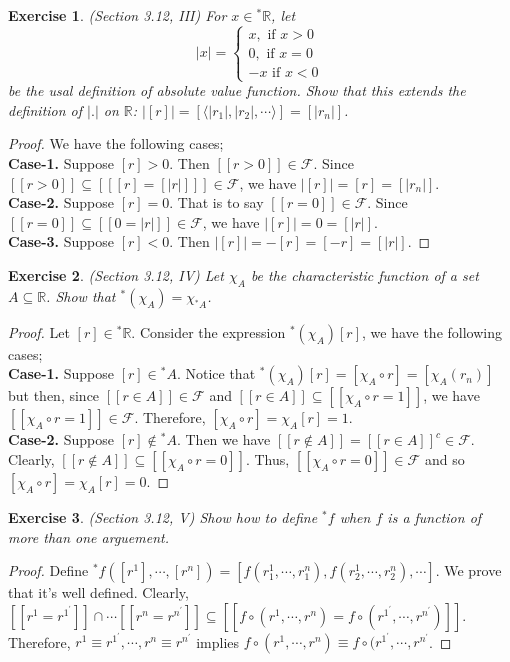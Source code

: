 \documentclass[a4paper, 11pt, openany]{book}
\theoremstyle{plain}
\newtheorem{exercise}{Exercise}[chapter]
\theoremstyle{plain}
\newcommand{\mc}{\mathcal}
\newcommand{\R}{\mathbb{R}}
\newcommand{\la}{\langle}
\newcommand{\ra}{\rangle}
\newcommand{\p}{\prime}
\newcommand{\hyp}{{}^*}
\begin{document}
  \begin{exercise}
    (Section 3.12, III)
     For $x \in \hyp \R$, let $$|x| = \begin{cases} x, \text{ if } x>0 \\ 0, \text{ if } x=0 \\ -x \text{ if } x<0 \end{cases}$$ be the usal definition of absolute value function. Show that this extends the definition of $|.|$ on $\R$: $|[r]|=[ \la |r_1|, |r_2|,\cdots \ra]=[|r_n|]$.
  \end{exercise}
  \begin{proof}
    We have the following cases; \\
    \textbf{Case-1.} Suppose $[r]>0$. Then $[[r>0]] \in \mc{F}$. Since $[[r>0]] \subseteq [[ [r]=[|r|]]] \in \mc{F}$, we have $|[r]|=[r]=[|r_n|]$. \\
    \textbf{Case-2.} Suppose $[r]=0$. That is to say $[[r=0]] \in \mc{F}$. Since $[[r=0]] \subseteq [[0=|r|]] \in \mc{F}$, we have $|[r]|=0=[|r|]$. \\
    \textbf{Case-3.} Suppose $[r]<0$. Then $| [r]|=-[r]=[-r]=[|r|]$.
  \end{proof}

  \begin{exercise}
    (Section 3.12, IV)
    Let $\chi_A$ be the characteristic function of a set $A \subseteq \R$. Show that $\hyp (\chi_A)=\chi_{\hyp A}$.
  \end{exercise}
  \begin{proof}
    Let $[r] \in \hyp \R$. Consider the expression $\hyp (\chi_A)[r]$, we have the following cases; \\
    \textbf{Case-1.} Suppose $[r] \in \hyp A$. Notice that $\hyp (\chi_A)[r]=[\chi_A \circ r]=[\chi_A(r_n)]$ but then, since $[[r \in A]] \in \mc{F}$ and $[[r \in A]] \subseteq [[\chi_A \circ r=1]]$, we have $[[\chi_A \circ r=1]] \in \mc{F}$. Therefore, $[\chi_A \circ r]=\chi_A [r]=1$. \\
    \textbf{Case-2.} Suppose $[r] \notin \hyp A$. Then we have $[[r \notin A]]=[[r \in A]]^c \in \mc{F}$. Clearly, $[[r \notin A]] \subseteq [[\chi_A \circ r=0]]$. Thus, $[[\chi_A \circ r=0]] \in \mc{F}$ and so $[\chi_A \circ r]=\chi_A [r]=0$.
  \end{proof}
  \begin{exercise}
    (Section 3.12, V)
    Show how to define $\hyp f$ when $f$ is a function of more than one arguement.
  \end{exercise}
  \begin{proof}
    Define $\hyp f([r^1],\cdots,[r^n])=[f(r^1_1, \cdots, r^n_1),f(r^1_2,\cdots, r^n_2), \cdots]$. We prove that it's well defined. Clearly, $[[r^1=r^{1^\p}]] \cap \cdots [[r^n=r^{n^\p}]] \subseteq [[f \circ (r^1,\cdots, r^n)=f \circ (r^{1^\p}, \cdots, r^{n^\p})]]$. Therefore, $r^1 \equiv r^{1^\p}, \cdots, r^n \equiv r^{n^\p}$ implies $f \circ (r^1,\cdots, r^n) \equiv f \circ (r^{1^\p}, \cdots, r^{n^\p}$.
  \end{proof}
\end{document}
